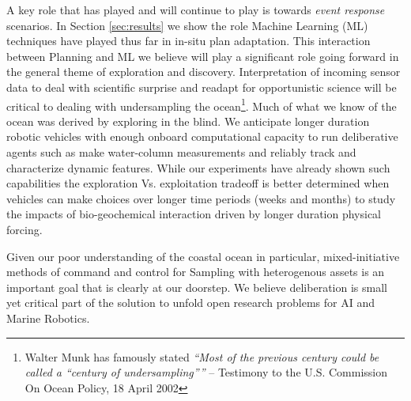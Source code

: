 A key role that \rx has played and will continue to play is towards
\emph{event response} scenarios. In Section \ref{sec:results} we show
the role Machine Learning (ML) techniques have played thus far in
in-situ plan adaptation. This interaction between Planning and ML we
believe will play a significant role going forward in the general
theme of exploration and discovery. Interpretation of incoming sensor
data to deal with scientific surprise and readapt for opportunistic
science will be critical to dealing with undersampling the
ocean\footnote{Walter Munk has famously stated \emph{``Most of the
    previous century could be called a “century of undersampling”''}
  -- Testimony to the U.S. Commission On Ocean Policy, 18 April
  2002}. Much of what we know of the ocean was derived by exploring in
the blind. We anticipate longer duration robotic vehicles with enough
onboard computational capacity to run deliberative agents such as \rx
make water-column measurements and reliably track and characterize
dynamic features. While our experiments have already shown such
capabilities the exploration Vs. exploitation tradeoff is better
determined when vehicles can make choices over longer time periods
(weeks and months) to study the impacts of bio-geochemical interaction
driven by longer duration physical forcing. 

Given our poor understanding of the coastal ocean in particular,
mixed-initiative methods of command and control for Sampling with
heterogenous assets is an important goal that is clearly at our
doorstep. We believe deliberation is small yet critical part of the
solution to unfold open research problems for AI and Marine Robotics.
